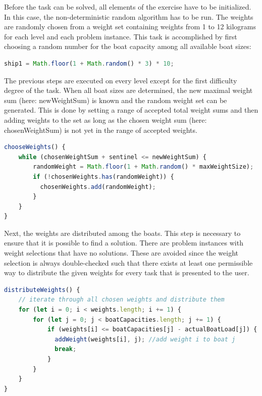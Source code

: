 Before the task can be solved, all elements of the exercise have to be initialized. In this case, the non-deterministic random algorithm has to be run. The weights are randomly chosen from a weight set containing weights from 1 to 12 kilograms for each level and each problem instance. This task is accomplished by first choosing a random number for the boat capacity among all available boat sizes:

\begin{lstlisting}[language=TypeScript,caption={},label={lst:chooseBoatSize}]
ship1 = Math.floor(1 + Math.random() * 3) * 10;
\end{lstlisting}

The previous steps are executed on every level except for the first difficulty degree of the task. When all boat sizes are determined, the new maximal weight sum (here: newWeightSum) is known and the random weight set can be generated. This is done by setting a range of accepted total weight sums and then adding weights to the set as long as the chosen weight sum (here: chosenWeightSum) is not yet in the range of accepted weights.

\begin{lstlisting}[language=TypeScript,caption={},label={lst:chooseWeights}]
chooseWeights() {
    while (chosenWeightSum + sentinel <= newWeightSum) {
        randomWeight = Math.floor(1 + Math.random() * maxWeightSize);
        if (!chosenWeights.has(randomWeight)) {
          chosenWeights.add(randomWeight);
        }
    }
}
\end{lstlisting}

Next, the weights are distributed among the boats. This step is necessary to ensure that it is possible to find a solution. There are problem instances with weight selections that have no solutions. These are avoided since the weight selection is always double-checked such that there exists at least one permissible way to distribute the given weights for every task that is presented to the user.

\begin{lstlisting}[language=TypeScript,caption={},label={lst:distributeWeights}]
distributeWeights() {
    // iterate through all chosen weights and distribute them
    for (let i = 0; i < weights.length; i += 1) {
        for (let j = 0; j < boatCapacities.length; j += 1) {
            if (weights[i] <= boatCapacities[j] - actualBoatLoad[j]) {
              addWeight(weights[i], j); //add weight i to boat j
              break;
            }
        }
    }
}
\end{lstlisting}

